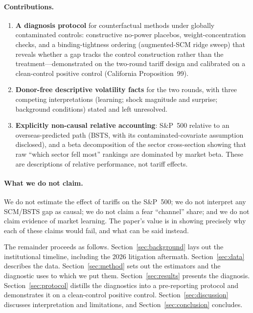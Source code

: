 \documentclass[11pt,a4paper]{article}
\begin{document}
\paragraph{Contributions.}
\begin{enumerate}
  \item \textbf{A diagnosis protocol} for counterfactual methods under
  globally contaminated controls: constructive no-power placebos,
  weight-concentration checks, and a binding-tightness ordering
  (augmented-SCM ridge sweep) that reveals whether a gap tracks the
  control construction rather than the treatment---demonstrated on the
  two-round tariff design and calibrated on a clean-control positive
  control (California Proposition~99).
  \item \textbf{Donor-free descriptive volatility facts} for the two
  rounds, with three competing interpretations (learning; shock magnitude
  and surprise; background conditions) stated and left unresolved.
  \item \textbf{Explicitly non-causal relative accounting}: S\&P~500
  relative to an overseas-predicted path (BSTS, with its
  contaminated-covariate assumption disclosed), and a beta decomposition of
  the sector cross-section showing that raw ``which sector fell most''
  rankings are dominated by market beta. These are descriptions of relative
  performance, not tariff effects.
\end{enumerate}

\paragraph{What we do not claim.} We do not estimate the effect of tariffs
on the S\&P~500; we do not interpret any SCM/BSTS gap as causal; we do not
claim a fear ``channel'' share; and we do not claim evidence of market
learning. The paper's value is in showing precisely why each of these
claims would fail, and what can be said instead.

The remainder proceeds as follows. Section~\ref{sec:background} lays out
the institutional timeline, including the 2026 litigation aftermath.
Section~\ref{sec:data} describes the data. Section~\ref{sec:method} sets
out the estimators and the diagnostic uses to which we put them.
Section~\ref{sec:results} presents the diagnosis. Section~\ref{sec:protocol}
distills the diagnostics into a pre-reporting protocol and demonstrates it
on a clean-control positive control. Section~\ref{sec:discussion} discusses
interpretation and limitations, and Section~\ref{sec:conclusion} concludes.
\end{document}
